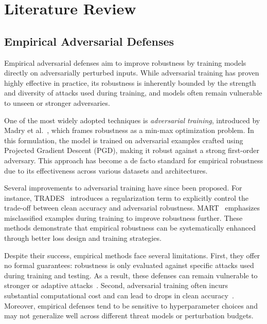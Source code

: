 \chapter{Literature Review}

\section{Empirical Adversarial Defenses}
\indent

Empirical adversarial defenses aim to improve robustness by training models directly on adversarially perturbed inputs. While adversarial training has proven highly effective in practice, its robustness is inherently bounded by the strength and diversity of attacks used during training, and models often remain vulnerable to unseen or stronger adversaries.

One of the most widely adopted techniques is \textit{adversarial training}, introduced by Madry et al.~\cite{madry2017towards}, which frames robustness as a min-max optimization problem. In this formulation, the model is trained on adversarial examples crafted using Projected Gradient Descent (PGD), making it robust against a strong first-order adversary. This approach has become a de facto standard for empirical robustness due to its effectiveness across various datasets and architectures.

Several improvements to adversarial training have since been proposed. For instance, TRADES~\cite{zhang2019theoretically} introduces a regularization term to explicitly control the trade-off between clean accuracy and adversarial robustness. MART~\cite{wang2019improving} emphasizes misclassified examples during training to improve robustness further. These methods demonstrate that empirical robustness can be systematically enhanced through better loss design and training strategies.

Despite their success, empirical methods face several limitations. First, they offer no formal guarantees: robustness is only evaluated against specific attacks used during training and testing. As a result, these defenses can remain vulnerable to stronger or adaptive attacks~\cite{tramer2020adaptive}. Second, adversarial training often incurs substantial computational cost and can lead to drops in clean accuracy~\cite{rice2020overfitting}. Moreover, empirical defenses tend to be sensitive to hyperparameter choices and may not generalize well across different threat models or perturbation budgets.

